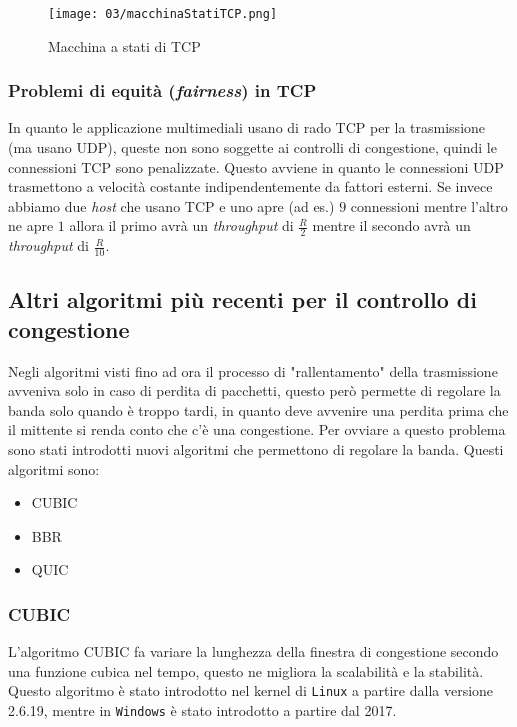             \begin{figure}[H]
                \centering
                \texttt{[image: 03/macchinaStatiTCP.png]}
                \caption{Macchina a stati di \Acrshort*{TCP}}
            \end{figure}
        \subsubsection{Problemi di equità (\textit{fairness}) in \Acrshort*{TCP}}
            In quanto le applicazione multimediali usano di rado \Acrshort*{TCP} per la trasmissione (ma usano \Acrshort*{UDP}), queste non sono soggette ai controlli di congestione, quindi le connessioni \Acrshort*{TCP} sono penalizzate. Questo avviene in quanto le connessioni \Acrshort*{UDP} trasmettono a velocità costante indipendentemente da fattori esterni.\newline
            Se invece abbiamo due \textit{host} che usano \Acrshort*{TCP} e uno apre (ad es.) $ 9 $ connessioni mentre l'altro ne apre $ 1 $ allora il primo avrà un \textit{throughput} di $ \frac{R}2 $ mentre il secondo avrà un \textit{throughput} di $ \frac{R} {10} $.
    \subsection{Altri algoritmi più recenti per il controllo di congestione}
        Negli algoritmi visti fino ad ora il processo di "rallentamento" della trasmissione avveniva solo in caso di perdita di pacchetti, questo però permette di regolare la banda solo quando è troppo tardi, in quanto deve avvenire una perdita prima che il mittente si renda conto che c'è una congestione. Per ovviare a questo problema sono stati introdotti nuovi algoritmi che permettono di regolare la banda. Questi algoritmi sono: \begin{itemize}
            \item \acrfull*{CUBIC}
            \item \acrfull*{BBR}
            \item \acrfull*{QUIC}
        \end{itemize}
        \subsubsection{\acrfull*{CUBIC}}
            L'algoritmo \Acrshort*{CUBIC} fa variare la lunghezza della finestra di congestione secondo una funzione cubica nel tempo, questo ne migliora la scalabilità e la stabilità. Questo algoritmo è stato introdotto nel kernel di \texttt{Linux} a partire dalla versione 2.6.19, mentre in \texttt{Windows} è stato introdotto a partire dal 2017.
